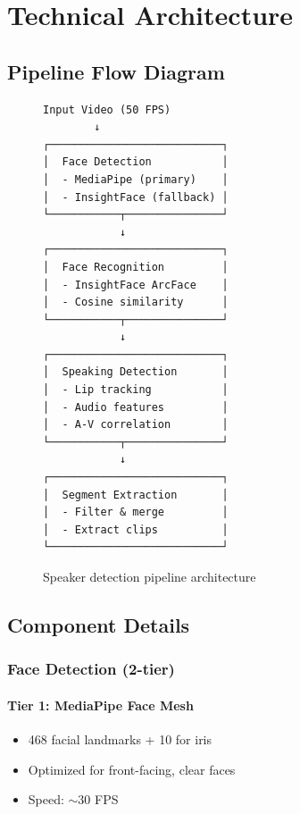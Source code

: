 \documentclass[11pt,a4paper]{article}
\begin{document}
\section{Technical Architecture}

\subsection{Pipeline Flow Diagram}

\begin{figure}[h]
\centering
\begin{tcolorbox}[colback=white,colframe=black,width=\textwidth]
\small
\begin{verbatim}
Input Video (50 FPS)
        ↓
┌───────────────────────────┐
│  Face Detection           │
│  - MediaPipe (primary)    │
│  - InsightFace (fallback) │
└───────────┬───────────────┘
            ↓
┌───────────────────────────┐
│  Face Recognition         │
│  - InsightFace ArcFace    │
│  - Cosine similarity      │
└───────────┬───────────────┘
            ↓
┌───────────────────────────┐
│  Speaking Detection       │
│  - Lip tracking           │
│  - Audio features         │
│  - A-V correlation        │
└───────────┬───────────────┘
            ↓
┌───────────────────────────┐
│  Segment Extraction       │
│  - Filter & merge         │
│  - Extract clips          │
└───────────────────────────┘
\end{verbatim}
\end{tcolorbox}
\caption{Speaker detection pipeline architecture}
\label{fig:pipeline}
\end{figure}

\subsection{Component Details}

\subsubsection{Face Detection (2-tier)}

\paragraph{Tier 1: MediaPipe Face Mesh}
\begin{itemize}
    \item 468 facial landmarks + 10 for iris
    \item Optimized for front-facing, clear faces
    \item Speed: $\sim$30 FPS
\end{itemize}
\end{document}
